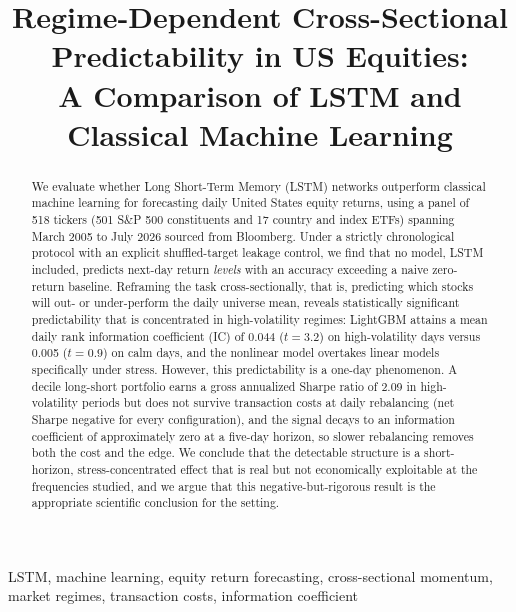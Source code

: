 \documentclass[conference]{IEEEtran}
\begin{document}
\title{Regime-Dependent Cross-Sectional Predictability in US Equities:\\
A Comparison of LSTM and Classical Machine Learning}

\author{
}

\maketitle

\begin{abstract}
We evaluate whether Long Short-Term Memory (LSTM) networks outperform classical
machine learning for forecasting daily United States equity returns, using a
panel of 518 tickers (501 S\&P 500 constituents and 17 country and index ETFs) spanning March 2005 to July 2026 sourced from Bloomberg. Under a strictly chronological protocol with an explicit shuffled-target
leakage control, we find that no model, LSTM included, predicts next-day return
\emph{levels} with an accuracy exceeding a naive zero-return baseline. Reframing
the task cross-sectionally, that is, predicting which stocks will out- or
under-perform the daily universe mean, reveals statistically significant
predictability that is concentrated in high-volatility regimes: LightGBM attains a mean daily rank information coefficient (IC) of 0.044 ($t=3.2$) on
high-volatility days versus 0.005 ($t=0.9$) on calm days, and the nonlinear model
overtakes linear models specifically under stress. However, this predictability
is a one-day phenomenon. A decile long-short portfolio earns a gross annualized
Sharpe ratio of 2.09 in high-volatility periods but does not survive transaction
costs at daily rebalancing (net Sharpe negative for every configuration), and the
signal decays to an information coefficient of approximately zero at a five-day
horizon, so slower rebalancing removes both the cost and the edge. We conclude
that the detectable structure is a short-horizon, stress-concentrated effect that
is real but not economically exploitable at the frequencies studied, and we argue
that this negative-but-rigorous result is the appropriate scientific conclusion
for the setting.
\end{abstract}

\begin{IEEEkeywords}
LSTM, machine learning, equity return forecasting, cross-sectional momentum,
market regimes, transaction costs, information coefficient
\end{IEEEkeywords}
\end{document}
